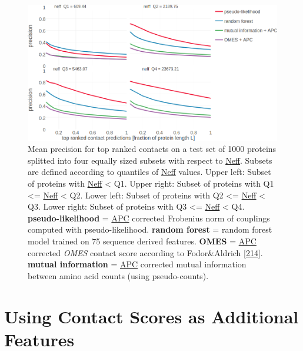 \documentclass[11pt,a4paper,twoside]{book}
\theoremstyle{definition}
\theoremstyle{definition}
\theoremstyle{remark}
\begin{document}
\begin{figure}
\includegraphics[width=1\linewidth]{img/random_forest_contact_prior/precision_vs_rank_facetted_by_neff_notitle} \caption{Mean precision for top ranked contacts
on a test set of 1000 proteins splitted into four equally sized subsets
with respect to \protect\hyperlink{abbrev}{Neff}. Subsets are defined
according to quantiles of \protect\hyperlink{abbrev}{Neff} values. Upper
left: Subset of proteins with \protect\hyperlink{abbrev}{Neff}
\textless{} Q1. Upper right: Subset of proteins with Q1 \textless{}=
\protect\hyperlink{abbrev}{Neff} \textless{} Q2. Lower left: Subset of
proteins with Q2 \textless{}= \protect\hyperlink{abbrev}{Neff}
\textless{} Q3. Lower right: Subset of proteins with Q3 \textless{}=
\protect\hyperlink{abbrev}{Neff} \textless{} Q4.
\textbf{pseudo-likelihood} = \protect\hyperlink{abbrev}{APC} corrected
Frobenius norm of couplings computed with pseudo-likelihood.
\textbf{random forest} = random forest model trained on 75 sequence
derived features. \textbf{OMES} = \protect\hyperlink{abbrev}{APC}
corrected \emph{OMES} contact score according to Fodor\&Aldrich
{[}\protect\hyperlink{ref-Fodor2004a}{214}{]}. \textbf{mutual
information} = \protect\hyperlink{abbrev}{APC} corrected mutual
information between amino acid counts (using pseudo-counts).}\label{fig:performance-neff-rf}
\end{figure}

\section{Using Contact Scores as Additional
Features}\label{using-contact-scores-as-additional-features}
\end{document}
